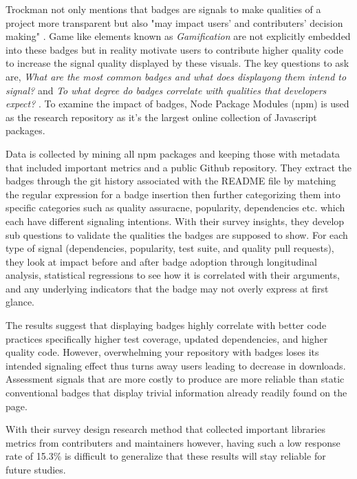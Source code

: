 \documentclass[12pt]{article}
\begin{document}
Trockman not only mentions that badges are signals to make qualities of a project more transparent but also "may impact users' and contributers' decision making" \cite{githubbadges}.
Game like elements known as \textit{Gamification} are not explicitly embedded into these badges but in reality motivate users to contribute higher quality code to increase the signal quality
displayed by these visuals. 
The key questions to ask are, \textit{What are the most common badges and what does displayong them intend to signal?} and \textit{To what degree do badges correlate with qualities that developers expect?} \cite{githubbadges}.
To examine the impact of badges, Node Package Modules (npm) \cite{npm} is used as the research repository as it's the largest online collection of Javascript packages. 

Data is collected by mining all npm \cite{npm} packages and keeping those with metadata that included 
important metrics and a public Github \cite{github} repository. They extract the badges through the git history associated with 
the README file by matching the regular expression for a badge insertion then further categorizing them into specific categories
such as quality assuracne, popularity, dependencies etc. which each have different signaling intentions.
With their survey insights, they develop sub questions to validate the qualities the badges are supposed to show. 
For each type of signal (dependencies, popularity, test suite, and quality pull requests), they look at 
impact before and after badge adoption through longitudinal analysis, statistical regressions
to see how it is correlated with their arguments, and any underlying indicators that the badge may not overly express at first glance.

The results suggest that displaying badges highly correlate with better code practices specifically higher test coverage, updated dependencies, and higher quality code.
However, overwhelming your repository with badges loses its intended signaling effect thus turns away users leading to decrease in downloads.
Assessment signals that are more costly to produce are more reliable than static conventional badges that display trivial information already readily found on the page.

With their survey design research method that collected important libraries metrics from contributers and maintainers however, having such a low response rate of 15.3\% 
is difficult to generalize that these results will stay reliable for future studies.
\end{document}
